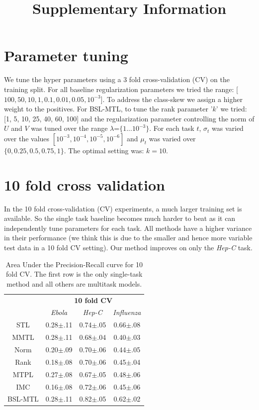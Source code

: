 \documentclass[a4paper,11pt]{article}
\begin{document}
\title{Supplementary Information}

\section{Parameter tuning}
We tune the hyper parameters using a 3 fold cross-validation (CV) on the training split. For all baseline regularization parameters %
we tried the range: [$100, 50, 10, 1, 0.1, 0.01, 0.05, 10^{-3}$]. To address the class-skew we 
assign a higher weight to the positives. For BSL-MTL, to tune the rank parameter '$k$' we tried: [1, 5, 10, 25, 40, 60, 100] and the regularization parameter controlling the norm of $U$ and $V$ was tuned over the range $\lambda$=$\{1 ... 10^{-3}\}$. For each task $t$, $\sigma_t$ was varied over the values $[10^{-3}, 10^{-4}, 10^{-5}, 10^{-6}]$ and
$\mu_t$ was varied over $\{0, 0.25, 0.5, 0.75, 1\}$.
The optimal setting was:  $k=10$. %

\section{10 fold cross validation}
In the 10 fold cross-validation (CV) experiments, a much larger training set is available. So the single task baseline becomes much harder to beat as it can independently tune parameters for each task. All methods have a higher variance in their performance (we think this is due to the smaller and hence more variable test data in a 10 fold CV setting). Our method improves on only the \textit{Hep-C} task.

\begin{table}[h]\caption{Area Under the Precision-Recall curve for 10 fold CV. The first row is the only single-task method and all others are multitask models.}
\label{resultsTable}
\begin{center}
\def\arraystretch{1.2}
\begin{tabular}{c|ccc}
\toprule
& \multicolumn{3}{c}{\textbf{10 fold CV}} \\
& \textit{Ebola} & \textit{Hep-C} & \textit{Influenza} \\ \midrule
 STL     & 0.28$\pm$.11 & 0.74$\pm$.05 & 0.66$\pm$.08  \\ 
 MMTL    & 0.28$\pm$.11 & 0.68$\pm$.04 & 0.40$\pm$.03  \\ 
 Norm    & 0.20$\pm$.09 & 0.70$\pm$.06 & 0.44$\pm$.05  \\ 
 Rank    & 0.18$\pm$.08 & 0.70$\pm$.06 & 0.45$\pm$.04  \\ 
 MTPL    & 0.27$\pm$.08 & 0.67$\pm$.05 & 0.48$\pm$.06  \\ 
 IMC     & 0.16$\pm$.08 & 0.72$\pm$.06 & 0.45$\pm$.06  \\ 
 BSL-MTL & 0.28$\pm$.11 & 0.82$\pm$.05 & 0.62$\pm$.02  \\ 
\bottomrule
\end{tabular}
\end{center}
\end{table}
\end{document}
